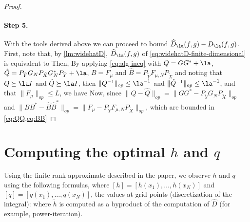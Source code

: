 \begin{proof}
\paragraph{Step 5.}
With the tools derived above we can proceed to bound $\widehat{D}_\la(f,g) - D_\la(f,g)$.
First, note that, by \cref{lm:widehatD}, $\widehat{D}_\la(f,g)$ of \cref{eq:widehatD-finite-dimensional} is equivalent to
Then,
By applying \cref{eq:alg-ineq} with $Q = GG^* + \la$, $\hat{Q} = P_{\tilde{Y}} G_N P_{\tilde{X}} G_N^*P_{\tilde{Y}} + \la$, $B = F_{\mu}$ and $\hat{B} = P_{\tilde{Y}} F_{\mu, N} P_{\tilde{X}}$ and noting that $Q \succeq \la I$ and $\hat{Q} \succeq \la I$, then $\|Q^{-1}\|_{op} \leq \la^{-1}$ and $\|\hat{Q}^{-1}\|_{op} \leq \la^{-1}$,
and that $\|F_{\mu}\|_{op} \leq L$, we have
Now, since $\|Q - \hat{Q}\|_{op} = \|GG^* - P_{\tilde{Y}}G_{N} P_{\tilde{X}}\|_{op}$ and  $\|BB^* - \hat{B}\hat{B}^*\|_{op} = \|F_\mu - P_{\tilde{Y}}F_{\mu,N} P_{\tilde{X}}\|_{op}$, which are bounded in \cref{eq:QQ,eq:BB}
\end{proof}


\section{Computing the optimal $h$ and $q$}\label{sec:appendix-hq}

Using the finite-rank approximate described in the paper, we observe $h$ and $q$ using the following formulas, where $[h] = [h(x_1), \ldots, h(x_N)]$ and $[q] = [q(x_1), \ldots, q(x_N)]$, the values at grid points (discretization of the integral):
where $\widetilde h$ is computed as a byproduct of the computation of $\widehat D$ (for example, power-iteration).
